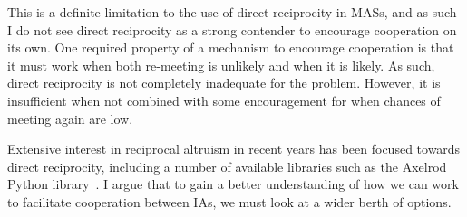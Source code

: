 \documentclass[]{final_report}
\begin{document}
This is a definite limitation to the use of direct reciprocity in MASs, and as such I do not see direct reciprocity as a strong contender to encourage cooperation on its own. One required property of a mechanism to encourage cooperation is that it must work when both re-meeting is unlikely and when it is likely. As such, direct reciprocity is not completely inadequate for the problem. However, it is insufficient when not combined with some encouragement for when chances of meeting again are low.\par
Extensive interest in reciprocal altruism in recent years has been focused towards direct reciprocity, including a number of available libraries such as the Axelrod Python library~\cite{axelrodproject}. I argue that to gain a better understanding of how we can work to facilitate cooperation between IAs,  we must look at a wider berth of options.
\end{document}
